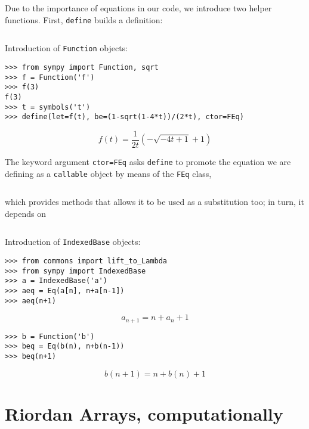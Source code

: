 Due to the importance of equations in our code, we introduce two
helper functions. First, \verb|define| builds a definition:
\inputminted[baselinestretch=0.8,stripnl=false,firstline=5,lastline=10]
    {python}{deps/simulation-methods/src/commons.py}

\begin{example}
Introduction of \verb|Function| objects:
\begin{verbatim}
>>> from sympy import Function, sqrt
>>> f = Function('f')
>>> f(3)
f(3)
>>> t = symbols('t')
>>> define(let=f(t), be=(1-sqrt(1-4*t))/(2*t), ctor=FEq)
\end{verbatim}
\begin{displaymath}
f{\left (t \right )} = \frac{1}{2 t} \left(- \sqrt{- 4 t + 1} + 1\right)
\end{displaymath}
\end{example}

The keyword argument \verb|ctor=FEq| asks \verb|define| to promote
the equation we are defining as a \verb|callable| object by means of
the \verb|FEq| class,
\inputminted[baselinestretch=0.8,stripnl=false,firstline=46, lastline=78]
    {python}{deps/simulation-methods/src/commons.py}
\noindent which provides methods that allows it to be used as a substitution
too; in turn, it depends on
\inputminted[baselinestretch=0.8,stripnl=false,firstline=12, lastline=19]
    {python}{deps/simulation-methods/src/commons.py}

\begin{example}
Introduction of \verb|IndexedBase| objects:
\begin{verbatim}
>>> from commons import lift_to_Lambda
>>> from sympy import IndexedBase
>>> a = IndexedBase('a')
>>> aeq = Eq(a[n], n+a[n-1])
>>> aeq(n+1)
\end{verbatim}
\begin{displaymath}
    a_{n + 1} = n + a_{n} + 1
\end{displaymath}
\begin{verbatim}
>>> b = Function('b')
>>> beq = Eq(b(n), n+b(n-1))
>>> beq(n+1)
\end{verbatim}
\begin{displaymath}
    b{\left (n + 1 \right )} = n + b{\left (n \right )} + 1
\end{displaymath}
\end{example}

\section{Riordan Arrays, computationally}

